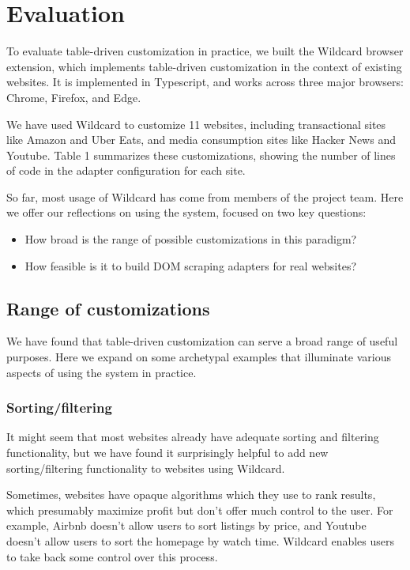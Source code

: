 \documentclass[sigplan,screen,10pt,anonymous,review]{acmart}
\providecommand{\tightlist}{%
  \setlength{\itemsep}{0pt}\setlength{\parskip}{0pt}}
\begin{document}
\hypertarget{sec:evaluation}{%
\section{Evaluation}\label{sec:evaluation}}

To evaluate table-driven customization in practice, we built the
Wildcard browser extension, which implements table-driven customization
in the context of existing websites. It is implemented in Typescript,
and works across three major browsers: Chrome, Firefox, and Edge.

We have used Wildcard to customize 11 websites, including transactional
sites like Amazon and Uber Eats, and media consumption sites like Hacker
News and Youtube. Table 1 summarizes these customizations, showing the
number of lines of code in the adapter configuration for each site.

So far, most usage of Wildcard has come from members of the project
team. Here we offer our reflections on using the system, focused on two
key questions:

\begin{itemize}
\tightlist
\item
  How broad is the range of possible customizations in this paradigm?
\item
  How feasible is it to build DOM scraping adapters for real websites?
\end{itemize}

\hypertarget{range-of-customizations}{%
\subsection{Range of customizations}\label{range-of-customizations}}

We have found that table-driven customization can serve a broad range of
useful purposes. Here we expand on some archetypal examples that
illuminate various aspects of using the system in practice.

\hypertarget{sortingfiltering}{%
\subsubsection{Sorting/filtering}\label{sortingfiltering}}

It might seem that most websites already have adequate sorting and
filtering functionality, but we have found it surprisingly helpful to
add new sorting/filtering functionality to websites using Wildcard.

Sometimes, websites have opaque algorithms which they use to rank
results, which presumably maximize profit but don't offer much control
to the user. For example, Airbnb doesn't allow users to sort listings by
price, and Youtube doesn't allow users to sort the homepage by watch
time. Wildcard enables users to take back some control over this
process.
\end{document}
